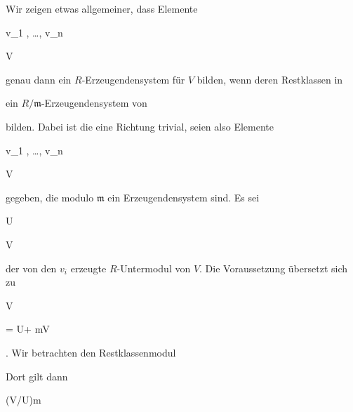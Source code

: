 {


Wir zeigen etwas allgemeiner, dass Elemente


\mavergleichskette

{\vergleichskette

{ v_1 , \ldots , v_n
}

{ \in }{ V
}

{  }{
}

{    }{
}

{   }{
}

}
{}{}{}
genau dann ein $R$-Erzeugendensystem für $V$ bilden, wenn deren Restklassen in

 ein $R/{\mathfrak m}$-Erzeugendensystem von

 bilden. Dabei ist die eine Richtung trivial, seien also Elemente


\mavergleichskette

{\vergleichskette

{ v_1 , \ldots , v_n
}

{ \in }{ V
}

{  }{
}

{    }{
}

{   }{
}

}
{}{}{}
gegeben, die modulo ${\mathfrak m}$ ein Erzeugendensystem sind. Es sei


\mavergleichskette

{\vergleichskette

{U
}

{ \subseteq }{ V
}

{  }{
}

{    }{
}

{   }{
}

}
{}{}{}
der von den $v_i$ erzeugte $R$-Untermodul von $V$. Die Voraussetzung übersetzt sich zu


\mavergleichskette

{\vergleichskette

{V
}

{ = }{ U+ {\mathfrak m}V
}

{  }{
}

{    }{
}

{   }{
}

}
{}{}{.}
Wir betrachten den Restklassenmodul

 Dort gilt dann


\mavergleichskette

{\vergleichskette

{ (V/U){\mathfrak m}
}

}}
